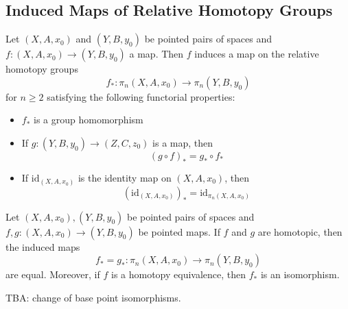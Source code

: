 \documentclass[a4paper]{article}
\begin{document}
\subsection{Induced Maps of Relative Homotopy Groups}
\begin{thm}{}{} Let $(X,A,x_0)$ and $(Y,B,y_0)$ be pointed pairs of spaces and $f:(X,A,x_0)\to(Y,B,y_0)$ a map. Then $f$ induces a map on the relative homotopy groups $$f_\ast:\pi_n(X,A,x_0)\to\pi_n(Y,B,y_0)$$ for $n\geq 2$ satisfying the following functorial properties: 
\begin{itemize}
\item $f_\ast$ is a group homomorphism
\item If $g:(Y,B,y_0)\to(Z,C,z_0)$ is a map, then $$(g\circ f)_\ast=g_\ast\circ f_\ast$$
\item If $\text{id}_{(X,A,x_0)}$ is the identity map on $(X,A,x_0)$, then $$(\text{id}_{(X,A,x_0)})_\ast=\text{id}_{\pi_n(X,A,x_0)}$$
\end{itemize}
\end{thm}

\begin{thm}{}{} Let $(X,A,x_0),(Y,B,y_0)$ be pointed pairs of spaces and $f,g:(X,A,x_0)\to (Y,B,y_0)$ be pointed maps. If $f$ and $g$ are homotopic, then the induced maps $$f_\ast=g_\ast:\pi_n(X,A,x_0)\to\pi_n(Y,B,y_0)$$ are equal. Moreover, if $f$ is a homotopy equivalence, then $f_\ast$ is an isomorphism. 
\end{thm}

TBA: change of base point isomorphisms. 
\end{document}

